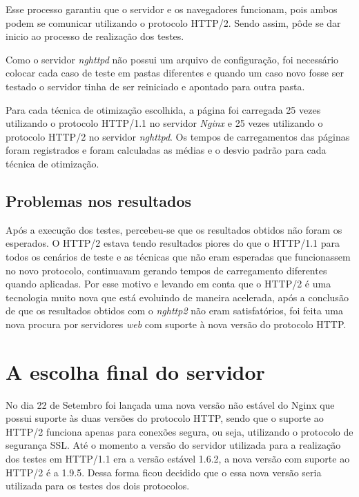 Esse processo garantiu que o servidor e os navegadores funcionam, pois ambos podem se comunicar utilizando o protocolo HTTP/2. Sendo assim, pôde se dar inicio ao processo de realização dos testes.

Como o servidor \textit{nghttpd} não possui um arquivo de configuração, foi necessário colocar cada caso de teste em pastas diferentes e quando um caso novo fosse ser testado o servidor tinha de ser reiniciado e apontado para outra pasta.

Para cada técnica de otimização escolhida, a página foi carregada 25 vezes utilizando o protocolo HTTP/1.1 no servidor \textit{Nginx} e 25 vezes utilizando o protocolo HTTP/2 no servidor \textit{nghttpd}. Os tempos de carregamentos das páginas foram registrados e foram calculadas as médias e o desvio padrão para cada técnica de otimização.

\subsection{Problemas nos resultados}
\label{problemasnosresultados}

Após a execução dos testes, percebeu-se que os resultados obtidos não foram os esperados. O HTTP/2 estava tendo resultados piores do que o HTTP/1.1 para todos os cenários de teste e as técnicas que não eram esperadas que funcionassem no novo protocolo, continuavam gerando tempos de carregamento diferentes quando aplicadas. Por esse motivo e levando em conta que o HTTP/2 é uma tecnologia muito nova que está evoluindo de maneira acelerada, após a conclusão de que os resultados obtidos com o \textit{nghttp2} não eram satisfatórios, foi feita uma nova procura por servidores \textit{web} com suporte à nova versão do protocolo HTTP.

\section{A escolha final do servidor}
\label{aescolhafinaldoservidor}


No dia 22 de Setembro foi lançada uma nova versão não estável do Nginx que possui suporte às duas versões do protocolo HTTP, sendo que o suporte ao HTTP/2 funciona apenas para conexões segura, ou seja, utilizando o protocolo de segurança SSL. Até o momento a versão do servidor utilizada para a realização dos testes em HTTP/1.1 era a versão estável 1.6.2, a nova versão com suporte ao HTTP/2 é a 1.9.5. Dessa forma ficou decidido que o essa nova versão seria utilizada para os testes dos dois protocolos.

